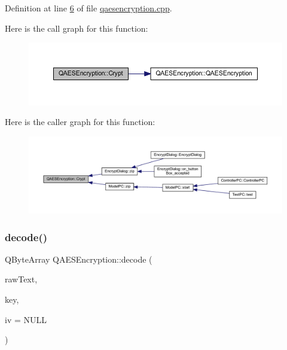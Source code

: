 Definition at line \mbox{\hyperlink{qaesencryption_8cpp_source_l00006}{6}} of file \mbox{\hyperlink{qaesencryption_8cpp_source}{qaesencryption.\+cpp}}.

Here is the call graph for this function\+:
\nopagebreak
\begin{figure}[H]
\begin{center}
\leavevmode
\includegraphics[width=350pt]{class_q_a_e_s_encryption_a43819eeb6a7cb29fbd3cb6ad640dcbdf_cgraph}
\end{center}
\end{figure}
Here is the caller graph for this function\+:
\nopagebreak
\begin{figure}[H]
\begin{center}
\leavevmode
\includegraphics[width=350pt]{class_q_a_e_s_encryption_a43819eeb6a7cb29fbd3cb6ad640dcbdf_icgraph}
\end{center}
\end{figure}
\mbox{\label{class_q_a_e_s_encryption_a58f972f2b66c2454edd5112495463bba}} 
\subsubsection{\texorpdfstring{decode()}{decode()}}
{\footnotesize\ttfamily Q\+Byte\+Array Q\+A\+E\+S\+Encryption\+::decode (\begin{DoxyParamCaption}\item[{const Q\+Byte\+Array \&}]{raw\+Text,  }\item[{const Q\+Byte\+Array \&}]{key,  }\item[{const Q\+Byte\+Array \&}]{iv = {\ttfamily NULL} }\end{DoxyParamCaption})}



